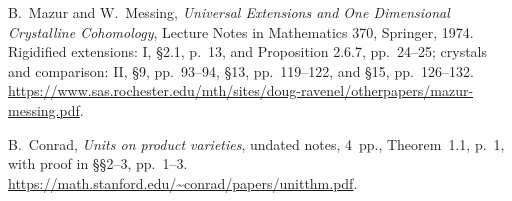 B.~Mazur and W.~Messing,
\emph{Universal Extensions and One Dimensional Crystalline Cohomology},
Lecture Notes in Mathematics 370, Springer, 1974.
Rigidified extensions: I, \S2.1, p.~13, and Proposition 2.6.7,
pp.~24--25; crystals and comparison: II, \S9, pp.~93--94,
\S13, pp.~119--122, and \S15, pp.~126--132.
\url{https://www.sas.rochester.edu/mth/sites/doug-ravenel/otherpapers/mazur-messing.pdf}.

B.~Conrad, \emph{Units on product varieties},
undated notes, 4~pp., Theorem~1.1, p.~1, with proof in
\S\S2--3, pp.~1--3.
\url{https://math.stanford.edu/~conrad/papers/unitthm.pdf}.
